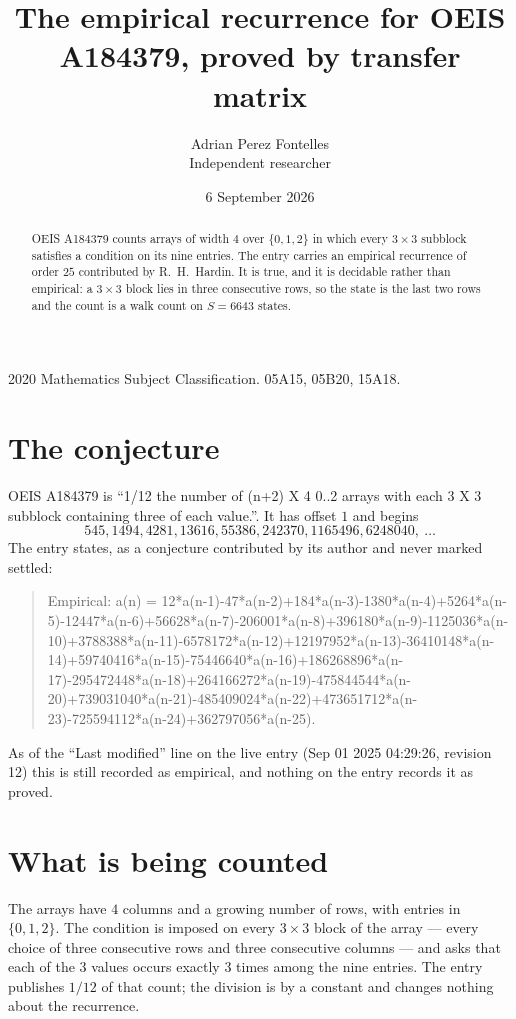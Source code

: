 \documentclass[11pt,a4paper]{article}
\title{The empirical recurrence for OEIS A184379, proved by transfer matrix}
\author{Adrian Perez Fontelles\\ \small Independent researcher}
\date{6 September 2026}
\theoremstyle{plain}
\theoremstyle{definition}
\begin{document}
\maketitle

\begin{abstract}
OEIS A184379 counts arrays of width $4$ over $\{0,1,2\}$ in which every $3\times3$ subblock
satisfies a condition on its nine entries. The entry carries an empirical recurrence of order
$25$ contributed by R.~H.~Hardin. It is true, and it is decidable rather than empirical: a
$3\times3$ block lies in three consecutive rows, so the state is the last two rows and the
count is a walk count on $S=6643$ states.
\end{abstract}

\noindent\small 2020 Mathematics Subject Classification. 05A15, 05B20, 15A18.\normalsize

\section{The conjecture}

OEIS A184379 is ``1/12 the number of (n+2) X 4 0..2 arrays with each 3 X 3 subblock containing three of each value.''. It has offset $1$ and begins
\[
545, 1494, 4281, 13616, 55386, 242370, 1165496, 6248040,\ \dots
\]
The entry states, as a conjecture contributed by its author and never marked settled:
\begin{quote}
Empirical: a(n) = 12*a(n-1)-47*a(n-2)+184*a(n-3)-1380*a(n-4)+5264*a(n-5)-12447*a(n-6)+56628*a(n-7)-206001*a(n-8)+396180*a(n-9)-1125036*a(n-10)+3788388*a(n-11)-6578172*a(n-12)+12197952*a(n-13)-36410148*a(n-14)+59740416*a(n-15)-75446640*a(n-16)+186268896*a(n-17)-295472448*a(n-18)+264166272*a(n-19)-475844544*a(n-20)+739031040*a(n-21)-485409024*a(n-22)+473651712*a(n-23)-725594112*a(n-24)+362797056*a(n-25).
\end{quote}
As of the ``Last modified'' line on the live entry (Sep 01 2025 04:29:26, revision 12) this is still
recorded as empirical, and nothing on the entry records it as proved.

\section{What is being counted}

The arrays have $4$ columns and a growing number of rows, with entries in $\{0,1,2\}$. The
condition is imposed on every $3\times3$ block of the array --- every choice of three
consecutive rows and three consecutive columns --- and asks that each of the $3$ values occurs exactly $3$ times among the nine entries. The entry publishes $1/12$ of that count; the division is by a constant and changes nothing about the recurrence.
\end{document}
